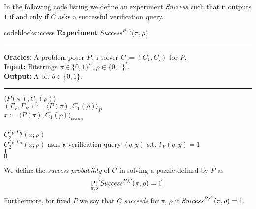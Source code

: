 In the following code listing we define an experiment $\operatorname{\mathit{Success}}$ such that
it outputs $1$ if and only if $C$ asks a successful verification query.
%
\begin{restatable}{codeblock}{success}
  \textbf{Experiment} $\operatorname{\mathit{Success}}^{P, C}(\pi, \rho)$
  \medskip \hrule
  \textbf{Oracles:} A problem poser $P$, a solver $C := (C_1, C_2)$ for $P$.\\
  \textbf{Input:}  Bitstrings $\pi \in \{0,1\}^n$, $\rho \in \{0,1\}^*$.\\
  \textbf{Output:} A bit $b \in \{0,1\}$.
  \medskip\hrule
  \Run $\langle P(\pi), C_1(\rho) \rangle$ \\
  \IndI $(\Gamma_V, \Gamma_H) := \langle P(\pi), C_1(\rho) \rangle_{P}$ \\
  \IndI $x := \langle P(\pi), C_1(\rho) \rangle_{\mathit{trans}}$ \\ \\
  \Run $C_2^{\Gamma_V,\Gamma_H}(x; \rho)$ \\
  \IndI \If $C_2^{\Gamma_V, \Gamma_H}(x; \rho)$ asks a verification query $(q, y)$ s.t. $\Gamma_V(q, y) = 1$ \Then \\
  \IndII \Return $1$ \\
  \Return $0$
\end{restatable}
%
We define the \textit{success probability} of $C$ in solving a puzzle defined by $P$ as
\begin{align}
 \underset{\pi, \rho}{\Pr}[\operatorname{\mathit{Success}}^{P,C}(\pi, \rho) = 1].
\end{align}
Furthermore, for fixed $P$ we say that $C$ \textit{succeeds} for $\pi$, $\rho$ if $\operatorname{\mathit{Success}}^{P,C}(\pi, \rho) = 1$.


